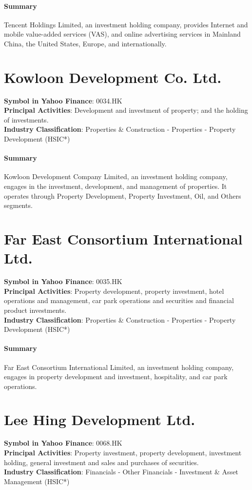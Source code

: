 \paragraph{Summary}
Tencent Holdings Limited, an investment holding company, provides Internet and mobile value-added services (VAS), and online advertising services in Mainland China, the United States, Europe, and internationally.


\section{Kowloon Development Co. Ltd.}
\textbf{Symbol in Yahoo Finance}: 0034.HK\\
\textbf{Principal Activities}: Development and investment of property; and the holding of investments.\\
\textbf{Industry Classification}: Properties \& Construction - Properties - Property Development (HSIC*)
\paragraph{Summary}
Kowloon Development Company Limited, an investment holding company, engages in the investment, development, and management of properties. It operates through Property Development, Property Investment, Oil, and Others segments.


\section{Far East Consortium International Ltd.}
\textbf{Symbol in Yahoo Finance}: 0035.HK\\
\textbf{Principal Activities}: Property development, property investment, hotel operations and management, car park operations and securities and financial product investments.\\
\textbf{Industry Classification}: Properties \& Construction - Properties - Property Development (HSIC*)
\paragraph{Summary}
Far East Consortium International Limited, an investment holding company, engages in property development and investment, hospitality, and car park operations.


\section{Lee Hing Development Ltd.}
\textbf{Symbol in Yahoo Finance}: 0068.HK\\
\textbf{Principal Activities}: Property investment, property development, investment holding, general investment and sales and purchases of securities.\\
\textbf{Industry Classification}: Financials - Other Financials - Investment \& Asset Management (HSIC*)
